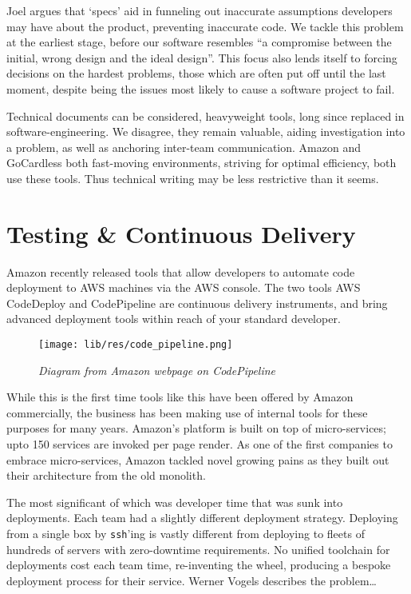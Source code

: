 \documentclass[11pt]{article}
\begin{document}
Joel argues that `specs' aid in funneling out
inaccurate assumptions developers may have about the product, preventing
inaccurate code. We tackle this problem at the earliest stage, before our
software resembles “a compromise between the initial, wrong design and the ideal
design”. This focus also lends itself to forcing decisions on the hardest
problems, those which are often put off until the last moment, despite being the
issues most likely to cause a software project to fail.

Technical documents can be considered, heavyweight tools, long since
replaced in software-engineering. We disagree, they remain valuable,
aiding investigation into a problem, as well as anchoring inter-team
communication. Amazon and GoCardless both fast-moving environments, striving 
for optimal efficiency, both use these tools. Thus technical writing may be less
 restrictive than it seems.

\section{Testing \& Continuous Delivery}

Amazon recently released tools that allow developers to automate code deployment
to AWS machines via the AWS console. The two tools AWS CodeDeploy and
CodePipeline are continuous delivery instruments, and bring advanced deployment
tools within reach of your standard developer.

\begin{figure}
\centering
\texttt{[image: lib/res/code\_pipeline.png]}
\caption{\label{fig:scoping}\textit{Diagram from Amazon webpage on
CodePipeline}}
\end{figure}

While this is the first time tools like this have been offered by Amazon
commercially, the business has been making use of internal tools for these
purposes for many years. Amazon's platform is built on top of micro-services;
upto 150 services are invoked per page render. As one of the first companies 
to embrace micro-services, Amazon tackled novel growing pains as they built out
their architecture from the old monolith.

The most significant of which was developer time that was sunk into deployments. 
Each team had a slightly different deployment strategy. Deploying from a single 
box by \texttt{ssh}'ing is vastly different from deploying to fleets of hundreds 
of servers with zero-downtime requirements. No unified toolchain for deployments 
cost each team time, re-inventing the wheel, producing a
bespoke deployment process for their service. Werner Vogels describes the
problem\dots
\end{document}
